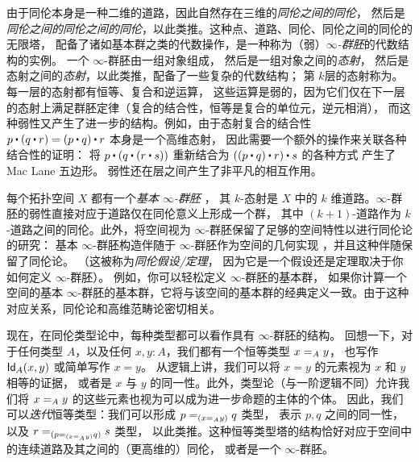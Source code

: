 由于同伦本身是一种二维的道路，因此自然存在三维的\emph{同伦之间的同伦}，
然后是\emph{同伦之间的同伦之间的同伦}，以此类推。这种点、道路、同伦、同伦之间的同伦的无限塔，
配备了诸如基本群之类的代数操作，是一种称为（弱）\emph{$\infty$-群胚}的代数结构的实例。
一个 $\infty$-群胚由一组对象组成，
然后是一组对象之间的\emph{态射}，
然后是态射之间的\emph{态射}，以此类推，配备了一些复杂的代数结构；
第 $k$层的态射称为。每一层的态射都有恒等、复合和逆运算，
这些运算是弱的，因为它们仅在下一层的态射上满足群胚定律（复合的结合性，恒等是复合的单位元，逆元相消），
而这种弱性又产生了进一步的结构。例如，由于态射复合的结合性 $p \ct (q \ct r) = (p \ct q) \ct r$ 本身是一个高维态射，
因此需要一个额外的操作来关联各种结合性的证明：
将 $p \ct (q \ct (r \ct s))$ 重新结合为 $((p \ct q) \ct r) \ct s$ 的各种方式
产生了 Mac Lane 五边形。
弱性还在层之间产生了非平凡的相互作用。

每个拓扑空间 $X$ 都有一个\emph{基本 $\infty$-群胚}
，
其 $k$-态射是 $X$ 中的 $k$ 维道路。$\infty$-群胚的弱性直接对应于道路仅在同伦意义上形成一个群，
其中 $(k+1)$-道路作为 $k$-道路之间的同伦。此外，将空间视为 $\infty$-群胚保留了足够的空间特性以进行同伦论的研究：
基本 $\infty$-群胚构造伴随于 $\infty$-群胚作为空间的几何实现
，并且这种伴随保留了同伦论。
（这被称为\emph{同伦假设/定理}，
因为它是一个假设还是定理取决于你如何定义 $\infty$-群胚）。
例如，你可以轻松定义 $\infty$-群胚的基本群，
如果你计算一个空间的基本 $\infty$-群胚的基本群，它将与该空间的基本群的经典定义一致。由于这种对应关系，同伦论和高维范畴论密切相关。

%
%

\mentalpause

现在，在同伦类型论中，每种类型都可以看作具有 $\infty$-群胚的结构。
回想一下，对于任何类型 $A$，以及任何 $x,y:A$，我们都有一个恒等类型 $\id[A]{x}{y}$，
也写作 $\idtype[A]{x}{y}$ 或简单写作 $x=y$。
从逻辑上讲，我们可以将 $x=y$ 的元素视为 $x$ 和 $y$ 相等的证据，
或者是 $x$ 与 $y$ 的同一性。此外，类型论（与一阶逻辑不同）允许我们将 $\id[A]{x}{y}$ 的这些元素也视为可以成为进一步命题的主体的个体。
因此，我们可以\emph{迭代}恒等类型：我们可以形成 $\id[{(\id[A]{x}{y})}]{p}{q}$ 类型，
表示 $p,q$ 之间的同一性，以及 $\id[{(\id[{(\id[A]{x}{y})}]{p}{q})}]{r}{s}$ 类型，
以此类推。这种恒等类型塔的结构恰好对应于空间中的连续道路及其之间的（更高维的）同伦，
或者是一个 $\infty$-群胚。

